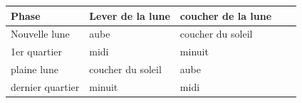 \documentclass[12pt]{book}
\begin{document}
\begin{itemize}
\begin{center}
                        \begin{tabular}{|l|l|l|l|l|}
                        \hline
                         Phase &  Lever de la lune & coucher de la lune    \\ \hline
                         Nouvelle lune& aube  &   coucher du soleil \\ \hline
                         1er quartier& midi &    minuit\\ \hline
                         plaine lune& coucher du soleil & aube    \\ \hline
                         dernier quartier&  minuit& midi    \\ \hline
                        \end{tabular}
                \end{center}
        \end{itemize}
\end{document}
